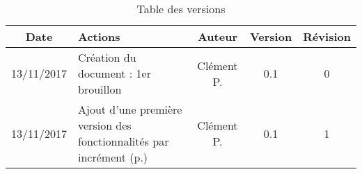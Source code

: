 
\begin{table}[!h]
\begin{center}
\begin{tabular}{|c|p{6cm}|c|c|c|}
\hline
\textbf{Date} & \textbf{Actions} & \textbf{Auteur} & \textbf{Version} & \textbf{Révision}\\
\hline
13/11/2017 & Création du document : 1er brouillon & Clément P. & 0.1 & 0\\
\hline
13/11/2017 & Ajout d'une première version des fonctionnalités par incrément (p.\pageref{refpFonctionnalités}) & Clément P. & 0.1 & 1\\
\hline
\end{tabular}
\end{center}
\caption{Table des versions}
\end{table}
